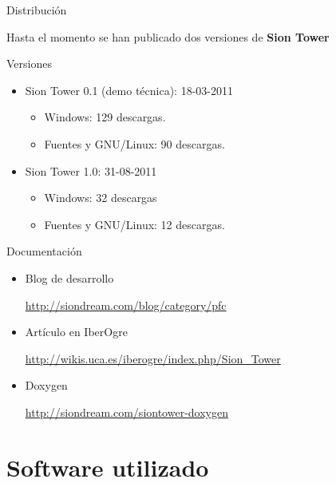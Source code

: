 \documentclass[green]{beamer}
\begin{document}
\begin{frame}{Distribución}
    
    Hasta el momento se han publicado dos versiones de \textbf{Sion Tower}

    \begin{block}{Versiones}
	\begin{itemize}
	    \item Sion Tower 0.1 (demo técnica): 18-03-2011
	    \begin{itemize}
		\item Windows: 129 descargas.
		\item Fuentes y GNU/Linux: 90 descargas.
	    \end{itemize}
	    \item Sion Tower 1.0: 31-08-2011
	    \begin{itemize}
		\item Windows: 32 descargas
		\item Fuentes y GNU/Linux: 12 descargas.
	    \end{itemize}
	\end{itemize}
    \end{block}
\end{frame}
    
    
\begin{frame}{Documentación}
    
    \begin{itemize}
	\item Blog de desarrollo
	
	\url{http://siondream.com/blog/category/pfc}\\
	
	\item Artículo en IberOgre
	
	\url{http://wikis.uca.es/iberogre/index.php/Sion_Tower}\\
	
	\item Doxygen
	
	\url{http://siondream.com/siontower-doxygen}\\
    \end{itemize}
\end{frame}

\section[Software]{Software utilizado}
\end{document}
